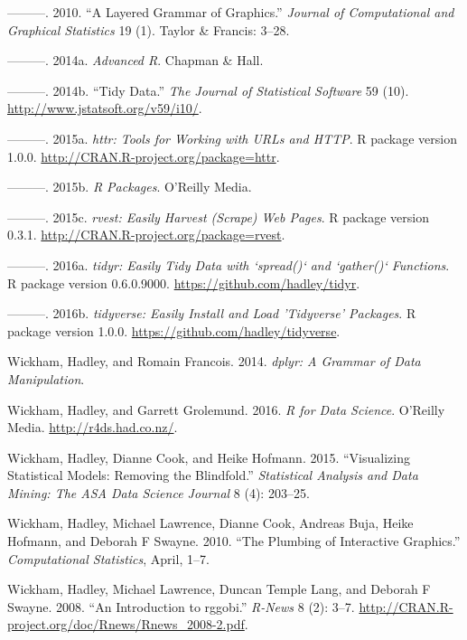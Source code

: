 \documentclass[12pt,]{isuthesis}
\begin{document}
\hypertarget{ref-ggplot2-paper}{}
---------. 2010. ``A Layered Grammar of Graphics.'' \emph{Journal of
Computational and Graphical Statistics} 19 (1). Taylor \& Francis:
3--28.

\hypertarget{ref-adv-r}{}
---------. 2014a. \emph{Advanced R}. Chapman \& Hall.

\hypertarget{ref-tidy-data}{}
---------. 2014b. ``Tidy Data.'' \emph{The Journal of Statistical
Software} 59 (10). \url{http://www.jstatsoft.org/v59/i10/}.

\hypertarget{ref-httr}{}
---------. 2015a. \emph{httr: Tools for Working with URLs and HTTP}. R
package version 1.0.0. \url{http://CRAN.R-project.org/package=httr}.

\hypertarget{ref-rpkgs}{}
---------. 2015b. \emph{R Packages}. O'Reilly Media.

\hypertarget{ref-rvest}{}
---------. 2015c. \emph{rvest: Easily Harvest (Scrape) Web Pages}. R
package version 0.3.1. \url{http://CRAN.R-project.org/package=rvest}.

\hypertarget{ref-tidyr}{}
---------. 2016a. \emph{tidyr: Easily Tidy Data with `spread()` and
`gather()` Functions}. R package version 0.6.0.9000.
\url{https://github.com/hadley/tidyr}.

\hypertarget{ref-tidyverse}{}
---------. 2016b. \emph{tidyverse: Easily Install and Load 'Tidyverse'
Packages}. R package version 1.0.0.
\url{https://github.com/hadley/tidyverse}.

\hypertarget{ref-dplyr}{}
Wickham, Hadley, and Romain Francois. 2014. \emph{dplyr: A Grammar of
Data Manipulation}.

\hypertarget{ref-r4ds}{}
Wickham, Hadley, and Garrett Grolemund. 2016. \emph{R for Data Science}.
O'Reilly Media. \url{http://r4ds.had.co.nz/}.

\hypertarget{ref-model-vis-paper}{}
Wickham, Hadley, Dianne Cook, and Heike Hofmann. 2015. ``Visualizing
Statistical Models: Removing the Blindfold.'' \emph{Statistical Analysis
and Data Mining: The ASA Data Science Journal} 8 (4): 203--25.

\hypertarget{ref-plumbing}{}
Wickham, Hadley, Michael Lawrence, Dianne Cook, Andreas Buja, Heike
Hofmann, and Deborah F Swayne. 2010. ``The Plumbing of Interactive
Graphics.'' \emph{Computational Statistics}, April, 1--7.

\hypertarget{ref-rggobi}{}
Wickham, Hadley, Michael Lawrence, Duncan Temple Lang, and Deborah F
Swayne. 2008. ``An Introduction to rggobi.'' \emph{R-News} 8 (2): 3--7.
\url{http://CRAN.R-project.org/doc/Rnews/Rnews_2008-2.pdf}.
\end{document}
